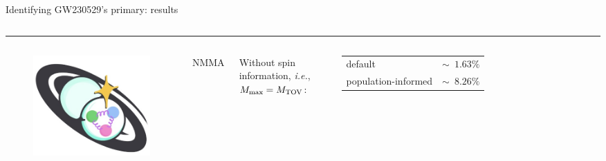 \documentclass[usenames,dvipsnames,t]{beamer}
\begin{document}
\begin{frame}{Identifying GW230529's primary: results}
\begin{minipage}[t][\heightlvk]{\textwidth}
\begin{columns}
    \end{columns}
    \end{minipage}

    \hrule

    \vspace{1mm}

    \pause

    \vspace{1mm}

    \begin{minipage}[t][\heightnmma]{\textwidth}
      \begin{columns}
  
        \begin{figure}[t]
          \centering
          \includegraphics[width=\linewidth]{Figures/NMMA logo.jpg}
        \end{figure}
        \begin{center}
          \textsc{NMMA}

          \scriptsize{}
        \end{center}
    
  
        Without spin information, \textit{i.e.}, $M_{\rm{max}} = M_{\rm{TOV}}$:

        \begin{table}
          \centering
          \begin{tabular}{| p{\mycolwidth} | p{\mycolwidthh} |}
            \hline
            default & $\sim \phantom{0}1.63\%$ \\
            population-informed & $\sim \phantom{0}8.26\%$ \\
            \hline
          \end{tabular}
        \end{table}


\end{columns}
\end{minipage}
\end{frame}
\end{document}

